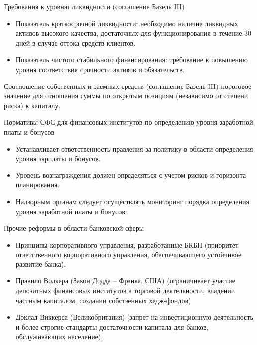 \documentclass[_Banking_p1.tex]{subfiles}
\begin{document}
\begin{frame} [ allowframebreaks]{\setfontsize{12pt}Требования к уровню ликвидности (соглашение Базель III)}
\begin{itemize}[<+->]
\item
Показатель краткосрочной ликвидности: необходимо наличие ликвидных активов высокого качества, достаточных для функционирования в течение 30 дней в случае оттока средств клиентов.

\item
Показатель чистого стабильного финансирования: требование к повышению уровня соответствия срочности активов и обязательств.

\end{itemize}

\end{frame}


\begin{frame}{\setfontsize{12pt} Соотношение собственных и заемных средств (соглашение Базель III)}
пороговое значение для отношения суммы по открытым позициям (независимо от степени риска) к капиталу.
\end{frame}

\begin{frame}[allowframebreaks]{\setfontsize{12pt} Нормативы СФС для финансовых институтов по определению уровня заработной платы и бонусов}
\begin{itemize}
\item
Устанавливает ответственность правления за политику в области определения уровня зарплаты и бонусов.

\item
Уровень вознаграждения должен определяться с учетом рисков и горизонта планирования.

\pagebreak
\item
Надзорным органам следует осуществлять мониторинг порядка определения уровня заработной платы и бонусов.

\end{itemize}

\end{frame}
\begin{frame}[allowframebreaks]{Прочие реформы в области банковской сферы}
\begin{itemize}
\item
Принципы корпоративного управления, разработанные БКБН (приоритет ответственного корпоративного управления, обеспечивающего устойчивое развитие банка).

\item
Правило Волкера (Закон Додда – Франка, США) (ограничивает участие депозитных финансовых институтов в торговой деятельности, владении частным капиталом, создании собственных хедж-фондов)

\pagebreak
\item
Доклад Виккерса (Великобритания) (запрет на инвестиционную деятельность и более строгие стандарты достаточности капитала для банков, обслуживающих население).

\end{itemize}

\end{frame}
\end{document}
